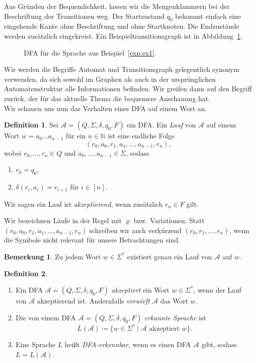 \documentclass[11pt, a4paper]{article}
\theoremstyle{definition}
\newtheorem{definition}{Definition}[section]
\newtheorem*{remark*}{Bemerkung}
\theoremstyle{plain}
\numberwithin{equation}{section}
\begin{document}
Aus Gründen der Bequemlichkeit, lassen wir die Mengenklammern bei der Beschriftung der Transitionen weg. Der Startzustand $q_0$ bekommt einfach eine eingehende Kante ohne Beschriftung und ohne Startknoten. Die Endzustände werden zusätzlich eingekreist. Ein Beispieltransitionsgraph ist in Abbildung~\ref{fig:dfa_ex1}.
\begin{figure}
	\centering
	
	\caption{DFA für die Sprache aus Beispiel~\ref{exp:ex1}.}
	\label{fig:dfa_ex1}
\end{figure}
Wir werden die Begriffe Automat und Transitionsgraph gelegentlich synonym verwenden, da sich sowohl im Graphen als auch in der ursprünglichen Automatenstruktur alle Informationen befinden. Wir greifen dann auf den Begriff zurück, der für das aktuelle Thema die bequemere Anschauung hat.\\
Wir schauen uns nun das Verhalten eines DFA auf einem Wort an.
\begin{definition}
	Sei $\mathcal{A} = (Q, \Sigma, \delta, q_0, F)$ ein DFA.
	Ein \textit{Lauf} von $\mathcal{A}$ auf einem Wort $w = a_0 \ldots a_{n-1}$ für ein $n \in \mathbb{N}$ ist eine endliche Folge
	$$
		(r_0, a_0, r_1, a_1, \ldots, a_{n-1}, r_n),
	$$
	wobei $r_0, \ldots, r_n \in Q$ und $a_0, \ldots, a_{n-1} \in \Sigma$, sodass
	\begin{enumerate}
		\item $r_0 = q_0$,
		\item $\delta(r_i, a_i) = r_{i+1}$ für $i \in [n]$.
	\end{enumerate}
	Wir sagen ein Lauf ist \textit{akzeptierend}, wenn zusätzlich $r_n \in F$ gilt.
\end{definition}
Wir bezeichnen Läufe in der Regel mit $\varrho$ bzw. Variationen. Statt $(r_0, a_0, r_1, a_1, \ldots, a_{n-1}, r_n)$ schreiben wir auch verkürzend $(r_0, r_1, \ldots, r_n)$, wenn die Symbole nicht relevant für unsere Betrachtungen sind.
\begin{remark*}
	Zu jedem Wort $w \in \Sigma^\ast$ existiert genau ein Lauf von $\mathcal{A}$ auf $w$.
\end{remark*}
\begin{definition}
\
	\begin{enumerate}
		\item Ein DFA $\mathcal{A} = (Q, \Sigma, \delta, q_0, F)$ \textit{akzeptiert} ein Wort $w \in \Sigma^\ast$, wenn der Lauf von $\mathcal{A}$ akzeptierend ist. Andernfalls \textit{verwirft} $\mathcal{A}$ das Wort $w$.
		\item Die von einem DFA $\mathcal{A} = (Q, \Sigma, \delta, q_0, F)$ \textit{erkannte Sprache} ist
			$$
				L(\mathcal{A}) \coloneqq \{ w \in \Sigma^\ast \mid \mathcal{A} \text{ akzeptiert } w \}.
			$$
		\item Eine Sprache $L$ heißt \textit{DFA-erkennbar}, wenn es einen DFA $\mathcal{A}$ gibt, sodass $L = L(\mathcal{A})$.
	\end{enumerate}
\end{definition}
\end{document}
